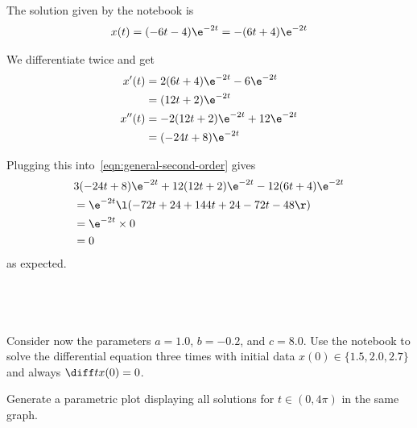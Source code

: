 \documentclass[a4paper]{article}
\begin{document}
The solution given by the notebook is \[
x(t) = (-6t - 4) \e^{-2t}
= -(6t + 4) \e^{-2t}
\]

We differentiate twice and get \begin{align*}
x'(t) &= 2(6t + 4) \e^{-2t} - 6 \e^{-2t} \\
&= (12t + 2) \e^{-2t} \\
x''(t) &= -2(12t + 2) \e^{-2t} + 12 \e^{-2t} \\
&= (-24t + 8) \e^{-2t}
\end{align*}

Plugging this into~\eqref{eqn:general-second-order} gives \begin{align*}
& 3 (-24t + 8) \e^{-2t} + 12 (12t + 2) \e^{-2t} - 12 (6t + 4) \e^{-2t} \\
&= \e^{-2t} \l( -72t + 24 + 144t + 24 - 72t - 48 \r) \\
&= \e^{-2t} \times 0 \\
&= 0
\end{align*} as expected.

\subsection{~} %

\begin{questionbody}
Consider now the parameters $a = 1.0$, $b = −0.2$, and $c = 8.0$. Use the notebook to solve the differential equation three times with initial data $x(0) \in \{1.5, 2.0, 2.7\}$ and always $\diff t x(0) = 0$.

Generate a parametric plot displaying all solutions for $t \in (0, 4\pi)$ in the same graph.
\end{questionbody}
\end{document}
